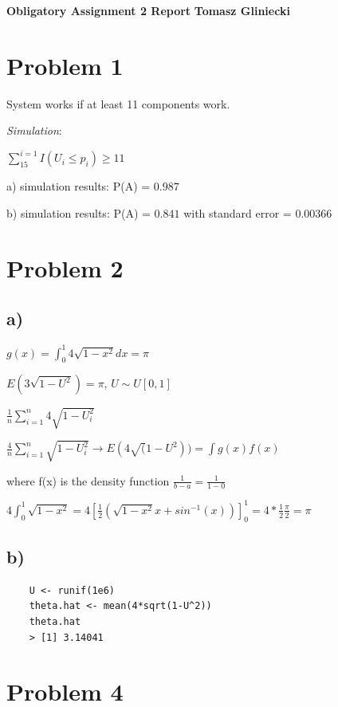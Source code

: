 \documentclass[a4paper, 11pt]{article}
\begin{document}
\noindent
\large\textbf{Obligatory Assignment 2 Report} \hfill \textbf{Tomasz Gliniecki} \\


\section*{Problem 1}
System works if at least 11 components work.

\emph{Simulation}:\\
\centerline{$ \sum_{15}^{i=1} I (U_i \leq p_i) \geq 11 $}

a)
simulation results: P(A) = $ 0.987 $

b)
simulation results: P(A) = $0.841$ with standard error = $0.00366$


\section*{Problem 2}
\subsection*{a)}
\begin{center}
  $g(x) = \int_{0}^{1} 4\sqrt{1-x^2} dx = \pi $

  $E(3\sqrt{1-U^2}) = \pi$, $U \sim U[0,1]$
  
  $\frac{1}{n}\sum_{i=1}^{n}4\sqrt{1-U_i^2}$

  $\frac{4}{n}\sum_{i=1}^{n}\sqrt{1-U_i^2} \rightarrow E(4\sqrt(1-U^2)) = \int g(x)f(x)$

  where f(x) is the density function $\frac{1}{b-a} = \frac{1}{1-0}$

  $4 \int_{0}^{1} \sqrt{1-x^2} = 4 [\frac{1}{2} (\sqrt{1-x^2} {} x + sin^{-1}(x)) ]_{0}^{1} = 4 * \frac{1}{2}\frac{\pi}{2} = \pi$
\end{center}

\subsection*{b)}
\begin{center}
  \begin{lstlisting}
    U <- runif(1e6)
    theta.hat <- mean(4*sqrt(1-U^2))
    theta.hat
    > [1] 3.14041
  \end{lstlisting}
\end{center}
\section*{Problem 4}
\end{document}
